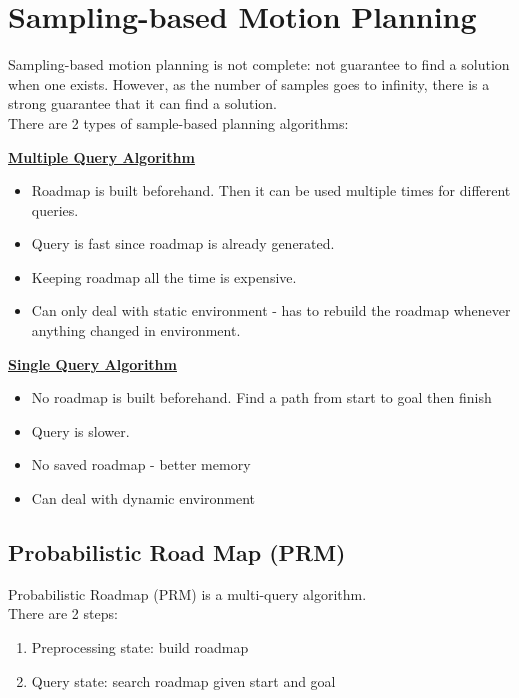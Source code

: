 \documentclass[11pt]{article}
\begin{document}
\section{Sampling-based Motion Planning}
Sampling-based motion planning is not complete: not guarantee to find a solution when one exists. However, as the number of samples goes to infinity, there is a strong guarantee that it can find a solution.\\
There are 2 types of sample-based planning algorithms:\\
\begin{multicols*}{2}
\textbf{\underline{Multiple Query Algorithm}}
\begin{itemize}
\item Roadmap is built beforehand. Then it can be used multiple times for different queries.
\item Query is fast since roadmap is already generated.
\item Keeping roadmap all the time is expensive.
\item Can only deal with static environment - has to rebuild the roadmap whenever anything changed in environment.
\end{itemize}
\vfill\null
\columnbreak
\textbf{\underline{Single Query Algorithm}}
\begin{itemize}
\item No roadmap is built beforehand. Find a path from start to goal then finish
\item Query is slower.\\
\item No saved roadmap - better memory \\
\item Can deal with dynamic environment 
\end{itemize}
\end{multicols*}

\subsection{Probabilistic Road Map (PRM)}
Probabilistic Roadmap (PRM) is a multi-query algorithm.\\
There are 2 steps:
\begin{enumerate}
\item Preprocessing state: build roadmap
\item Query state: search roadmap given start and goal
\end{enumerate}
\end{document}

